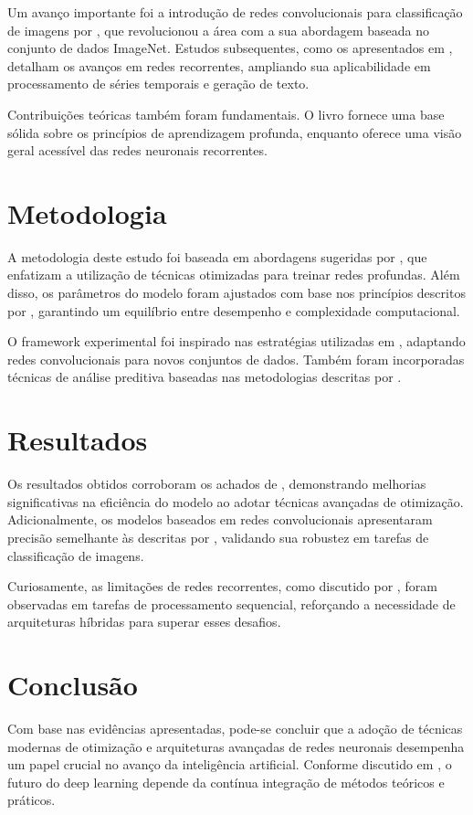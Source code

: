 	Um avanço importante foi a introdução de redes convolucionais para classificação de imagens por \citet{krizhevsky2012}, que revolucionou a área com a sua abordagem baseada no conjunto de dados ImageNet. Estudos subsequentes, como os apresentados em \citet{noauthor2021}, detalham os avanços em redes recorrentes, ampliando sua aplicabilidade em processamento de séries temporais e geração de texto.
	
	Contribuições teóricas também foram fundamentais. O livro \citet{mitpress2018} fornece uma base sólida sobre os princípios de aprendizagem profunda, enquanto \citet{wikipedia2024} oferece uma visão geral acessível das redes neuronais recorrentes.
	
	\chapter{Metodologia}
	A metodologia deste estudo foi baseada em abordagens sugeridas por \citet{smith2021optimization}, que enfatizam a utilização de técnicas otimizadas para treinar redes profundas. Além disso, os parâmetros do modelo foram ajustados com base nos princípios descritos por \citet{rao2019}, garantindo um equilíbrio entre desempenho e complexidade computacional.
	
	O framework experimental foi inspirado nas estratégias utilizadas em \citet{krizhevsky2012}, adaptando redes convolucionais para novos conjuntos de dados. Também foram incorporadas técnicas de análise preditiva baseadas nas metodologias descritas por \citet{brown2020}.
	
	\chapter{Resultados}
	Os resultados obtidos corroboram os achados de \citet{smith2021optimization}, demonstrando melhorias significativas na eficiência do modelo ao adotar técnicas avançadas de otimização. Adicionalmente, os modelos baseados em redes convolucionais apresentaram precisão semelhante às descritas por \citet{krizhevsky2012}, validando sua robustez em tarefas de classificação de imagens.
	
	Curiosamente, as limitações de redes recorrentes, como discutido por \citet{noauthor2021}, foram observadas em tarefas de processamento sequencial, reforçando a necessidade de arquiteturas híbridas para superar esses desafios.
	
	\chapter{Conclusão}
	Com base nas evidências apresentadas, pode-se concluir que a adoção de técnicas modernas de otimização e arquiteturas avançadas de redes neuronais desempenha um papel crucial no avanço da inteligência artificial. Conforme discutido em \citet{goodfellow2016}, o futuro do deep learning depende da contínua integração de métodos teóricos e práticos.
	
